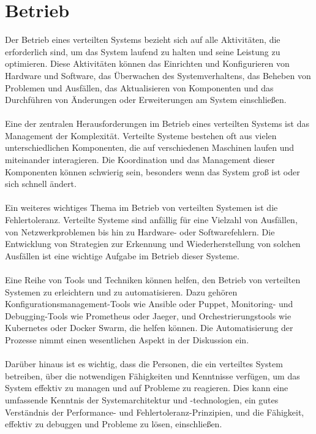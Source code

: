 \section{Betrieb}
Der Betrieb eines verteilten Systems bezieht sich auf alle Aktivitäten, die erforderlich sind, um das System laufend zu halten und seine Leistung zu optimieren. Diese Aktivitäten können das Einrichten und Konfigurieren von Hardware und Software, das Überwachen des Systemverhaltens, das Beheben von Problemen und Ausfällen, das Aktualisieren von Komponenten und das Durchführen von Änderungen oder Erweiterungen am System einschließen.
\\\\
Eine der zentralen Herausforderungen im Betrieb eines verteilten Systems ist das Management der Komplexität. Verteilte Systeme bestehen oft aus vielen unterschiedlichen Komponenten, die auf verschiedenen Maschinen laufen und miteinander interagieren. Die Koordination und das Management dieser Komponenten können schwierig sein, besonders wenn das System groß ist oder sich schnell ändert.
\\\\
Ein weiteres wichtiges Thema im Betrieb von verteilten Systemen ist die Fehlertoleranz. Verteilte Systeme sind anfällig für eine Vielzahl von Ausfällen, von Netzwerkproblemen bis hin zu Hardware- oder Softwarefehlern. Die Entwicklung von Strategien zur Erkennung und Wiederherstellung von solchen Ausfällen ist eine wichtige Aufgabe im Betrieb dieser Systeme.
\\\\
Eine Reihe von Tools und Techniken können helfen, den Betrieb von verteilten Systemen zu erleichtern und zu automatisieren. Dazu gehören Konfigurationsmanagement-Tools wie Ansible oder Puppet, Monitoring- und Debugging-Tools wie Prometheus oder Jaeger, und Orchestrierungstools wie Kubernetes oder Docker Swarm, die helfen können. Die Automatisierung der Prozesse nimmt einen wesentlichen Aspekt in der Diskussion ein.
\\\\
Darüber hinaus ist es wichtig, dass die Personen, die ein verteiltes System betreiben, über die notwendigen Fähigkeiten und Kenntnisse verfügen, um das System effektiv zu managen und auf Probleme zu reagieren. Dies kann eine umfassende Kenntnis der Systemarchitektur und -technologien, ein gutes Verständnis der Performance- und Fehlertoleranz-Prinzipien, und die Fähigkeit, effektiv zu debuggen und Probleme zu lösen, einschließen.

